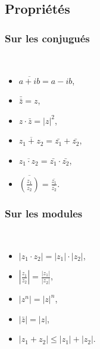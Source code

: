 \begin{fiche}
      \subsection*{Propri\'et\'es}
                  \subsubsection*{Sur les conjugu\'es} ~\\[-1.5\baselineskip]
                              \begin{itemize}
                                    \item $\overline{a+ib} = a-ib$,
                                    \item $\bar{\bar{z}} = z$,
                                    \item $z \cdot \bar{z} = |z|^2$,
                                    \item $\overline{z_1 + z_2} = \bar{z_1} + \bar{z_2}$,
                                    \item $\overline{z_1 \cdot z_2} = \bar{z_1} \cdot \bar{z_2}$,
                                    \item $\overline{\left(\frac{z_1}{z_2}\right)} = \displaystyle{\frac{\bar{z_1}}{\bar{z_2}}}$.
                              \end{itemize}
                  \subsubsection*{Sur les modules} ~\\[-1.5\baselineskip]
                        \begin{itemize}
                              \item $|z_1 \cdot z_2| = |z_1| \cdot |z_2|$,
                              \item $\left| \frac{z_1}{z_2} \right| = \frac{|z_1|}{|z_2|}$,
                              \item $|z^n| = |z|^n$,
                              \item $|\bar{z}| = |z|$,
                              \item $|z_1 + z_2| \leq |z_1| + |z_2|$.
                        \end{itemize}

\end{fiche}
